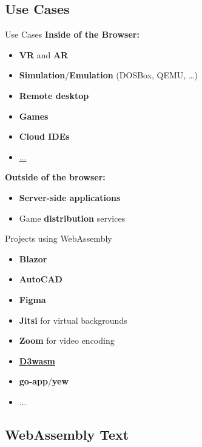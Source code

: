 \documentclass{beamer}
\begin{document}
\subsection{Use Cases}

\begin{frame}{Use Cases}
    \textbf{Inside of the Browser:}
    \begin{itemize}
        \item \textbf{VR} and \textbf{AR}
        \item \textbf{Simulation}/\textbf{Emulation} (DOSBox, QEMU, …)
        \item \textbf{Remote desktop}
        \item \textbf{Games}
        \item \textbf{Cloud IDEs}
        \item \href{https://webassembly.org/docs/use-cases/}{...}
    \end{itemize}
    \textbf{Outside of the browser:}
    \begin{itemize}
        \item \textbf{Server-side applications}
        \item Game \textbf{distribution} services
    \end{itemize}
\end{frame}

\begin{frame}{Projects using WebAssembly}
    \begin{itemize}
        \item \textbf{Blazor}
        \item \textbf{AutoCAD}
        \item \textbf{Figma}
        \item \textbf{Jitsi} for virtual backgrounds
        \item \textbf{Zoom} for video encoding
        \item \textbf{\href{https://wasm.continuation-labs.com/d3demo/}{D3wasm}}
        \item \textbf{go-app}/\textbf{yew}
        \item ...
    \end{itemize}
\end{frame}

\subsection{WebAssembly Text}
\end{document}
